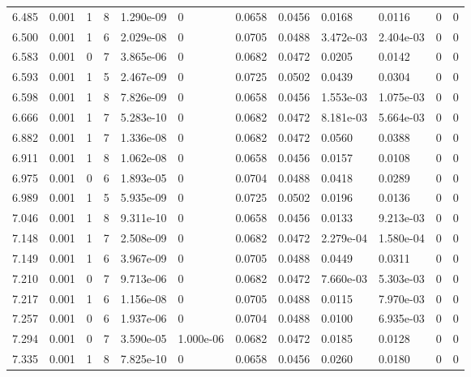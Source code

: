 \documentclass[preview]{standalone}
\begin{document}
{{{{\begin{tabular}{L{1.2cm}C{1.2cm} C{0.3cm}C{0.5cm} C{1.4cm}C{1.4cm} C{1.4cm}C{1.4cm} C{1.6cm}C{1.6cm} C{1.6cm}C{1.6cm}}
  6.485  &  0.001  & 1     &  8 &  1.290e-09  & 0  &  0.0658&   0.0456& 0.0168 & 0.0116   &  0 & 0  \\ 
  6.500  &  0.001  & 1     &  6 &  2.029e-08  & 0  &  0.0705&   0.0488& 3.472e-03 & 2.404e-03   &  0 & 0  \\ 
  6.583  &  0.001  & 0     &  7 &  3.865e-06  & 0  &  0.0682&   0.0472& 0.0205 & 0.0142   &  0 & 0  \\ 
  6.593  &  0.001  & 1     &  5 &  2.467e-09  & 0  &  0.0725&   0.0502& 0.0439 & 0.0304   &  0 & 0  \\ 
  6.598  &  0.001  & 1     &  8 &  7.826e-09  & 0  &  0.0658&   0.0456& 1.553e-03 & 1.075e-03   &  0 & 0  \\ 
  6.666  &  0.001  & 1     &  7 &  5.283e-10  & 0  &  0.0682&   0.0472& 8.181e-03 & 5.664e-03   &  0 & 0  \\ 
  6.882  &  0.001  & 1     &  7 &  1.336e-08  & 0  &  0.0682&   0.0472& 0.0560 & 0.0388   &  0 & 0  \\ 
  6.911  &  0.001  & 1     &  8 &  1.062e-08  & 0  &  0.0658&   0.0456& 0.0157 & 0.0108   &  0 & 0  \\ 
  6.975  &  0.001  & 0     &  6 &  1.893e-05  & 0  &  0.0704&   0.0488& 0.0418 & 0.0289   &  0 & 0  \\ 
  6.989  &  0.001  & 1     &  5 &  5.935e-09  & 0  &  0.0725&   0.0502& 0.0196 & 0.0136   &  0 & 0  \\ 
  7.046  &  0.001  & 1     &  8 &  9.311e-10  & 0  &  0.0658&   0.0456& 0.0133 & 9.213e-03   &  0 & 0  \\ 
  7.148  &  0.001  & 1     &  7 &  2.508e-09  & 0  &  0.0682&   0.0472& 2.279e-04 & 1.580e-04   &  0 & 0  \\ 
  7.149  &  0.001  & 1     &  6 &  3.967e-09  & 0  &  0.0705&   0.0488& 0.0449 & 0.0311   &  0 & 0  \\ 
  7.210  &  0.001  & 0     &  7 &  9.713e-06  & 0  &  0.0682&   0.0472& 7.660e-03 & 5.303e-03   &  0 & 0  \\ 
  7.217  &  0.001  & 1     &  6 &  1.156e-08  & 0  &  0.0705&   0.0488& 0.0115 & 7.970e-03   &  0 & 0  \\ 
  7.257  &  0.001  & 0     &  6 &  1.937e-06  & 0  &  0.0704&   0.0488& 0.0100 & 6.935e-03   &  0 & 0  \\ 
  7.294  &  0.001  & 0     &  7 &  3.590e-05  & 1.000e-06  &  0.0682&   0.0472& 0.0185 & 0.0128   &  0 & 0  \\ 
  7.335  &  0.001  & 1     &  8 &  7.825e-10  & 0  &  0.0658&   0.0456& 0.0260 & 0.0180   &  0 & 0  \\ 

\end{tabular}}}}}
\end{document}
